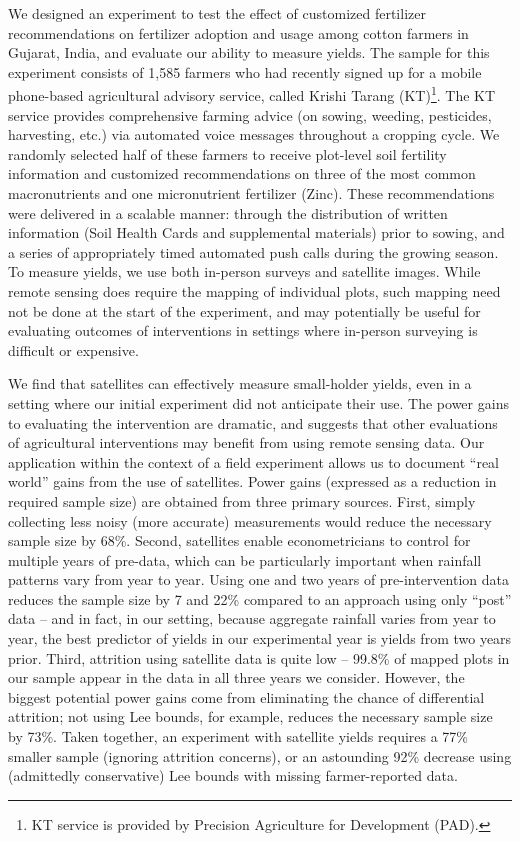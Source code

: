 \documentclass{article}
\begin{document}
We designed an experiment to test the effect of customized fertilizer recommendations on fertilizer adoption and usage among cotton farmers in Gujarat, India, and evaluate our ability to measure yields. The sample for this experiment consists of 1,585 farmers who had recently signed up for a mobile phone-based agricultural advisory service, called Krishi Tarang (KT)\footnote{KT service is provided by Precision Agriculture for Development (PAD).}. The KT service provides comprehensive farming advice (on sowing, weeding, pesticides, harvesting, etc.) via automated voice messages throughout a cropping cycle. We randomly selected half of these farmers to receive plot-level soil fertility information and customized recommendations on three of the most common macronutrients and one micronutrient fertilizer (Zinc). These recommendations were delivered in a scalable manner: through the distribution of written information (Soil Health Cards and supplemental materials) prior to sowing, and a series of appropriately timed automated push calls during the growing season. To measure yields, we use both in-person surveys and satellite images. While remote sensing does require the mapping of individual plots, such mapping need not be done at the start of the experiment, and may potentially be useful for evaluating outcomes of interventions in settings where in-person surveying is difficult or expensive.

We find that satellites can effectively measure small-holder yields, even in a setting where our initial experiment did not anticipate their use. The power gains to evaluating the intervention are dramatic, and suggests that other evaluations of agricultural interventions may benefit from using remote sensing data. Our application within the context of a field experiment allows us to document ``real world'' gains from the use of satellites. Power gains (expressed as a reduction in required sample size) are obtained from three primary sources. First, simply collecting less noisy (more accurate) measurements would reduce the necessary sample size by 68\%. Second, satellites enable econometricians to control for multiple years of pre-data, which can be particularly important when rainfall patterns vary from year to year. Using one and two years of pre-intervention data reduces the sample size by 7 and 22\% compared to an approach using only ``post'' data -- and in fact, in our setting, because aggregate rainfall varies from year to year, the best predictor of yields in our experimental year is yields from two years prior. Third, attrition using satellite data is quite low -- 99.8\% of mapped plots in our sample appear in the data in all three years we consider. However, the biggest potential power gains come from eliminating the chance of differential attrition; not using Lee bounds, for example, reduces the necessary sample size by 73\%. Taken together, an experiment with satellite yields requires a 77\% smaller sample (ignoring attrition concerns), or an astounding 92\% decrease using (admittedly conservative) Lee bounds with missing farmer-reported data.
\end{document}
